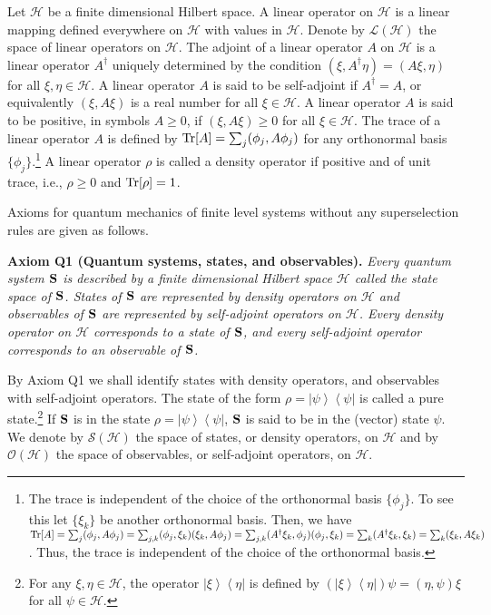 \documentclass[12pt]{article}
\newcommand{\bS}{{\bf S}}
\newcommand{\cH}{{\mathcal H}}
\newcommand{\cL}{{\mathcal L}}
\newcommand{\cO}{{\mathcal O}}
\newcommand{\cS}{{\mathcal S}}
\newcommand{\da}{\dagger}
\newcommand{\et}{\eta}
\newcommand{\ph}{\phi}
\def\ps{\psi}
\newcommand{\rh}{\rho}
\newcommand{\Tr}{\mbox{\rm Tr}}
\newcommand{\bra}[1]{\left\langle#1\right|}
\newcommand{\ket}[1]{\left|#1\right\rangle}
\begin{document}
Let  $\cH$  be a finite dimensional Hilbert space.  A linear operator on $\cH$ is
a linear mapping defined everywhere on $\cH$ with values in $\cH$.
Denote by $\cL(\cH)$ the space of linear operators on $\cH$.
The adjoint of a linear operator $A$ on $\cH$ is a linear operator $A^{\da}$ uniquely
determined by the condition $(\xi,A^{\da}\et)=(A\xi,\et)$ for all $\xi,\et\in\cH$.
A linear operator $A$ is said to be self-adjoint if $A^{\da}=A$, or equivalently
$(\xi,A\xi)$ is a real number for all $\xi\in\cH$.
A linear operator $A$ is said to be positive, in symbols $A\ge 0$, if $(\xi,A\xi)\ge 0$ for all $\xi\in\cH$.
The trace of a linear operator $A$ is defined by  $\Tr[A]=\sum_{j}(\ph_j,A\ph_j)$ for
any orthonormal basis $\{\ph_j\}$.\footnote{
The trace is independent of the choice of the orthonormal basis $\{\ph_j\}$.
To see this let $\{\xi_k\}$ be another orthonormal basis.  Then, we have
$\Tr[A]=\sum_{j}(\ph_j,A\ph_j)=\sum_{j,k}(\ph_j,\xi_k)(\xi_k,A\ph_j)=
\sum_{j,k}(A^{\da}\xi_k,\ph_j)(\ph_j,\xi_k)=\sum_{k}(A^{\da}\xi_k,\xi_k)
=\sum_{k}(\xi_k,A\xi_k)$.  Thus, the trace is independent of the choice of the
orthonormal basis.}
A linear operator $\rh$ is called a density operator if positive and of unit trace, i.e., 
$\rh\ge 0$ and $\Tr[\rh]=1$.  

Axioms for quantum mechanics of finite level systems without any superselection rules 
are given as follows.
\bigskip

{\bf Axiom Q1 (Quantum systems, states, and observables).}
{\em Every quantum system $\bS$ is described by a finite dimensional 
Hilbert space ${\mathcal H}$ called the {\em state space} of $\bS$. 
{\em States} of\/ $\bS$ are represented by density
operators on $\cH$ and {\em observables} 
of $\bS$ are represented by self-adjoint operators on $\cH$.
Every density operator on $\cH$ corresponds to a state of\/ $\bS$,
and every self-adjoint operator corresponds to an observable of\/ $\bS$.}
\bigskip



By Axiom Q1 we shall identify states with density operators,
and observables with self-adjoint operators.  The state of the form
$\rh=\ket{\ps}\bra{\ps}$ is called a {pure state}.\footnote{
For any $\xi,\et\in\cH$,  the operator $\ket{\xi}\bra{\et}$ is defined by
$(\ket{\xi}\bra{\et})\ps=(\et,\ps)\xi$ for all $\ps\in\cH$.
} 
If $\bS$ is in the state $\rh=\ket{\ps}\bra{\ps}$,
$\bS$ is said to be in the (vector) state $\ps$.
We denote by $\cS(\cH)$ the space of states, or density operators,  on $\cH$
and by $\cO(\cH)$ the space of observables, or self-adjoint operators,  on $\cH$. 
\bigskip
\end{document}
